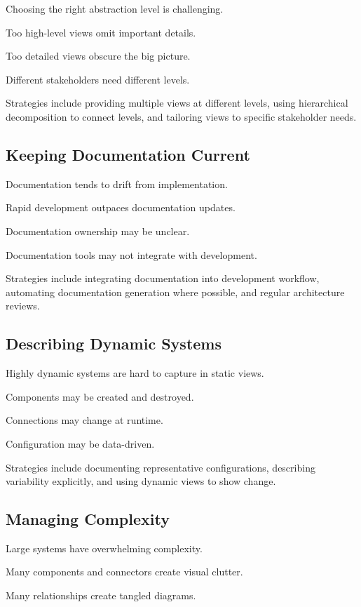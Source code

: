 \documentclass[11pt]{article}
\begin{document}
Choosing the right abstraction level is challenging.

Too high-level views omit important details.

Too detailed views obscure the big picture.

Different stakeholders need different levels.

Strategies include providing multiple views at different levels, using hierarchical decomposition to connect levels, and tailoring views to specific stakeholder needs.

\subsection{Keeping Documentation Current}

Documentation tends to drift from implementation.

Rapid development outpaces documentation updates.

Documentation ownership may be unclear.

Documentation tools may not integrate with development.

Strategies include integrating documentation into development workflow, automating documentation generation where possible, and regular architecture reviews.

\subsection{Describing Dynamic Systems}

Highly dynamic systems are hard to capture in static views.

Components may be created and destroyed.

Connections may change at runtime.

Configuration may be data-driven.

Strategies include documenting representative configurations, describing variability explicitly, and using dynamic views to show change.

\subsection{Managing Complexity}

Large systems have overwhelming complexity.

Many components and connectors create visual clutter.

Many relationships create tangled diagrams.
\end{document}
